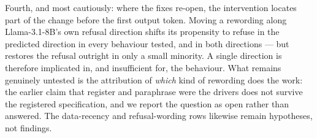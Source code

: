 Fourth, and most cautiously: where the fixes re-open, the intervention locates part of the change before the first
output token. Moving a rewording along Llama-3.1-8B's own refusal direction shifts its propensity to refuse in the
predicted direction in every behaviour tested, and in both directions --- but restores the refusal outright in only a
small minority. A single direction is therefore implicated in, and insufficient for, the behaviour. What remains
genuinely untested is the attribution of \emph{which} kind of rewording does the work: the earlier claim that register
and paraphrase were the drivers does not survive the registered specification, and we report the question as open
rather than answered. The data-recency and refusal-wording rows likewise remain hypotheses, not findings.
